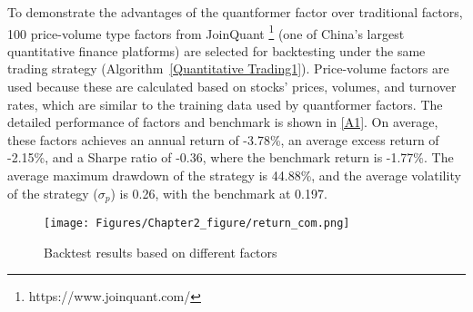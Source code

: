 \documentclass[preprint,12pt]{elsarticle}
\begin{document}
To demonstrate the advantages of the quantformer factor over traditional factors, 100 price-volume type factors from JoinQuant \footnote{https://www.joinquant.com/} (one of China's largest quantitative finance platforms) are selected for backtesting under the same trading strategy (Algorithm~\ref{Quantitative Trading1}). Price-volume factors are used because these are calculated based on stocks' prices, volumes, and turnover rates, which are similar to the training data used by quantformer factors. The detailed performance of factors and benchmark is shown in \ref{A1}. On average, these factors achieves an annual return of -3.78\%, an average excess return of -2.15\%, and a Sharpe ratio of -0.36, where the benchmark return is -1.77\%. The average maximum drawdown of the strategy is 44.88\%, and the average volatility of the strategy ($\sigma_p$) is 0.26, with the benchmark at 0.197.

\begin{figure}[ht]
\begin{center}
\texttt{[image: Figures/Chapter2\_figure/return\_com.png]}
\renewcommand{\figurename}{Figure}
\caption{Backtest results based on different factors}
\label{backtest_com}
\end{center}
\end{figure}
        
\end{document}
